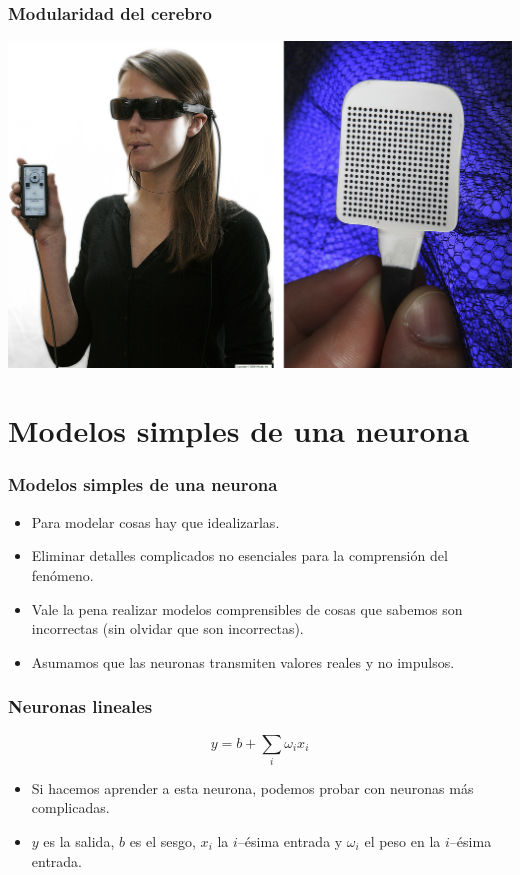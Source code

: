 \documentclass{beamer}
\begin{document}
\begin{frame}
  \frametitle{Modularidad del cerebro}
  \begin{center}
    \includegraphics[width=\textwidth]{imag/ver_lengua.jpg}
  \end{center}
\end{frame}



\section{Modelos simples de una neurona}

\begin{frame}
  \frametitle{Modelos simples de una neurona}
  \begin{itemize}
  \item Para modelar cosas hay que idealizarlas.
  \item Eliminar detalles complicados no esenciales para la
    comprensión del fenómeno.
  \item Vale la pena realizar modelos comprensibles de cosas que
    sabemos son incorrectas (sin olvidar que son incorrectas).
  \item Asumamos que las neuronas transmiten valores reales y no
    impulsos.
  \end{itemize}
\end{frame}

\begin{frame}
  \frametitle{Neuronas lineales}
  \begin{block}{}
    $$ y = b + \sum_{i} \omega_i x_i$$
  \end{block}
  \begin{itemize}
  \item Si hacemos aprender a esta neurona, podemos probar con
    neuronas más complicadas.
  \item $y$ es la \alert{salida}, $b$ es el \alert{sesgo}, $x_i$ la $i$--ésima
    \alert{entrada} y $\omega_i$ el \alert{peso} en la $i$--ésima entrada.
  \end{itemize}
\end{frame}
\end{document}
